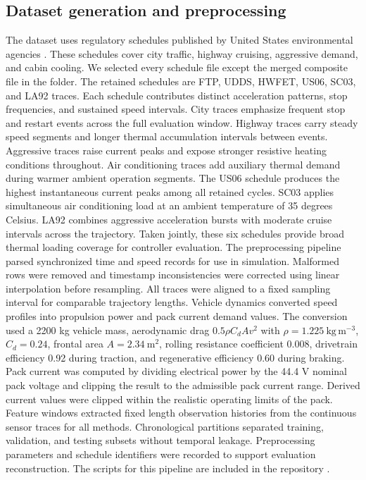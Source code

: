 \documentclass[twocolumn]{article}
\begin{document}
\subsection*{Dataset generation and preprocessing}

The dataset uses regulatory schedules published by United States environmental agencies \cite{EPA_Dynamometer}. These schedules cover city traffic, highway cruising, aggressive demand, and cabin cooling. We selected every schedule file except the merged composite file in the folder. The retained schedules are FTP, UDDS, HWFET, US06, SC03, and LA92 traces. Each schedule contributes distinct acceleration patterns, stop frequencies, and sustained speed intervals. City traces emphasize frequent stop and restart events across the full evaluation window. Highway traces carry steady speed segments and longer thermal accumulation intervals between events. Aggressive traces raise current peaks and expose stronger resistive heating conditions throughout. Air conditioning traces add auxiliary thermal demand during warmer ambient operation segments. The US06 schedule produces the highest instantaneous current peaks among all retained cycles. SC03 applies simultaneous air conditioning load at an ambient temperature of 35 degrees Celsius. LA92 combines aggressive acceleration bursts with moderate cruise intervals across the trajectory. Taken jointly, these six schedules provide broad thermal loading coverage for controller evaluation. The preprocessing pipeline parsed synchronized time and speed records for use in simulation. Malformed rows were removed and timestamp inconsistencies were corrected using linear interpolation before resampling. All traces were aligned to a fixed sampling interval for comparable trajectory lengths. Vehicle dynamics converted speed profiles into propulsion power and pack current demand values. The conversion used a 2200 kg vehicle mass, aerodynamic drag $0.5\rho C_d A v^2$ with $\rho = 1.225~\mathrm{kg\,m^{-3}}$, $C_d = 0.24$, frontal area $A = 2.34~\mathrm{m^2}$, rolling resistance coefficient 0.008, drivetrain efficiency 0.92 during traction, and regenerative efficiency 0.60 during braking. Pack current was computed by dividing electrical power by the 44.4 V nominal pack voltage and clipping the result to the admissible pack current range. Derived current values were clipped within the realistic operating limits of the pack. Feature windows extracted fixed length observation histories from the continuous sensor traces for all methods. Chronological partitions separated training, validation, and testing subsets without temporal leakage. Preprocessing parameters and schedule identifiers were recorded to support evaluation reconstruction. The scripts for this pipeline are included in the repository \cite{KeshavRepo2026}.
\end{document}
